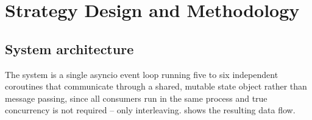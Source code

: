 \documentclass[11pt,a4paper]{article}
\begin{document}
\section{Strategy Design and Methodology}
\label{sec:methodology}

\subsection{System architecture}
\label{sec:architecture}

The system is a single asyncio event loop running five to six independent coroutines that
communicate through a shared, mutable state object rather than message passing, since all
consumers run in the same process and true concurrency is not required -- only interleaving.
 shows the resulting data flow.
\end{document}
